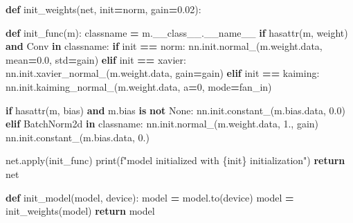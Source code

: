 \documentclass[
]{article}
\newenvironment{Shaded}{\begin{snugshade}}{\end{snugshade}}
\newcommand{\BuiltInTok}[1]{#1}
\newcommand{\ControlFlowTok}[1]{\textcolor[rgb]{0.13,0.29,0.53}{\textbf{#1}}}
\newcommand{\DecValTok}[1]{\textcolor[rgb]{0.00,0.00,0.81}{#1}}
\newcommand{\FloatTok}[1]{\textcolor[rgb]{0.00,0.00,0.81}{#1}}
\newcommand{\KeywordTok}[1]{\textcolor[rgb]{0.13,0.29,0.53}{\textbf{#1}}}
\newcommand{\NormalTok}[1]{#1}
\newcommand{\OperatorTok}[1]{\textcolor[rgb]{0.81,0.36,0.00}{\textbf{#1}}}
\newcommand{\SpecialCharTok}[1]{\textcolor[rgb]{0.00,0.00,0.00}{#1}}
\newcommand{\SpecialStringTok}[1]{\textcolor[rgb]{0.31,0.60,0.02}{#1}}
\newcommand{\StringTok}[1]{\textcolor[rgb]{0.31,0.60,0.02}{#1}}
\newcommand{\VariableTok}[1]{\textcolor[rgb]{0.00,0.00,0.00}{#1}}
\begin{document}
\begin{Shaded}
\begin{Highlighting}[]
\KeywordTok{def}\NormalTok{ init\_weights(net, init}\OperatorTok{=}\StringTok{\textquotesingle{}norm\textquotesingle{}}\NormalTok{, gain}\OperatorTok{=}\FloatTok{0.02}\NormalTok{):}
    
    \KeywordTok{def}\NormalTok{ init\_func(m):}
\NormalTok{        classname }\OperatorTok{=}\NormalTok{ m.\_\_class\_\_.}\VariableTok{\_\_name\_\_}
        \ControlFlowTok{if} \BuiltInTok{hasattr}\NormalTok{(m, }\StringTok{\textquotesingle{}weight\textquotesingle{}}\NormalTok{) }\KeywordTok{and} \StringTok{\textquotesingle{}Conv\textquotesingle{}} \KeywordTok{in}\NormalTok{ classname:}
            \ControlFlowTok{if}\NormalTok{ init }\OperatorTok{==} \StringTok{\textquotesingle{}norm\textquotesingle{}}\NormalTok{:}
\NormalTok{                nn.init.normal\_(m.weight.data, mean}\OperatorTok{=}\FloatTok{0.0}\NormalTok{, std}\OperatorTok{=}\NormalTok{gain)}
            \ControlFlowTok{elif}\NormalTok{ init }\OperatorTok{==} \StringTok{\textquotesingle{}xavier\textquotesingle{}}\NormalTok{:}
\NormalTok{                nn.init.xavier\_normal\_(m.weight.data, gain}\OperatorTok{=}\NormalTok{gain)}
            \ControlFlowTok{elif}\NormalTok{ init }\OperatorTok{==} \StringTok{\textquotesingle{}kaiming\textquotesingle{}}\NormalTok{:}
\NormalTok{                nn.init.kaiming\_normal\_(m.weight.data, a}\OperatorTok{=}\DecValTok{0}\NormalTok{, mode}\OperatorTok{=}\StringTok{\textquotesingle{}fan\_in\textquotesingle{}}\NormalTok{)}
            
            \ControlFlowTok{if} \BuiltInTok{hasattr}\NormalTok{(m, }\StringTok{\textquotesingle{}bias\textquotesingle{}}\NormalTok{) }\KeywordTok{and}\NormalTok{ m.bias }\KeywordTok{is} \KeywordTok{not} \VariableTok{None}\NormalTok{:}
\NormalTok{                nn.init.constant\_(m.bias.data, }\FloatTok{0.0}\NormalTok{)}
        \ControlFlowTok{elif} \StringTok{\textquotesingle{}BatchNorm2d\textquotesingle{}} \KeywordTok{in}\NormalTok{ classname:}
\NormalTok{            nn.init.normal\_(m.weight.data, }\FloatTok{1.}\NormalTok{, gain)}
\NormalTok{            nn.init.constant\_(m.bias.data, }\FloatTok{0.}\NormalTok{)}
            
\NormalTok{    net.}\BuiltInTok{apply}\NormalTok{(init\_func)}
    \BuiltInTok{print}\NormalTok{(}\SpecialStringTok{f"model initialized with }\SpecialCharTok{\{}\NormalTok{init}\SpecialCharTok{\}}\SpecialStringTok{ initialization"}\NormalTok{)}
    \ControlFlowTok{return}\NormalTok{ net}

\KeywordTok{def}\NormalTok{ init\_model(model, device):}
\NormalTok{    model }\OperatorTok{=}\NormalTok{ model.to(device)}
\NormalTok{    model }\OperatorTok{=}\NormalTok{ init\_weights(model)}
    \ControlFlowTok{return}\NormalTok{ model}
\end{Highlighting}
\end{Shaded}
\end{document}
